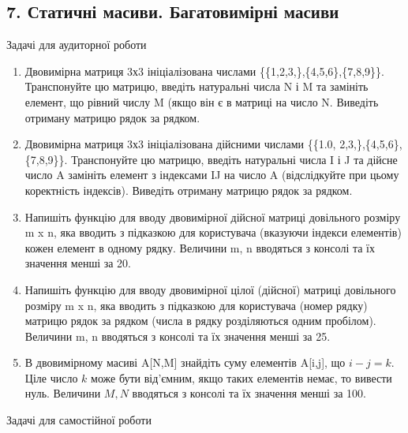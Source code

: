 \documentclass[]{article}
\makeatletter
\newcommand{\xslalph}[1]{\expandafter\@xslalph\csname c@#1\endcsname}
\newcommand{\@xslalph}[1]{%
    \ifcase#1\or а\or б\or в\or г\or д\or e\or є\or ж\or з\or i%
    \or й\or к\or л\or м\or н\or о\or п\or р\or с\or т%
    \or у\or ф\or х\or ц\or ч\or ш\or ю\or я\or аа\or бб\or вв%
    \else\@ctrerr\fi%
}
\makeatother
\begin{document}
\begin{enumerate}
\begin{enumerate}[label=\xslalph*)]
\begin{enumerate}
\begin{enumerate}[label=\xslalph*)]
\newpage
\subsection{ 7. Статичні масиви. Багатовимірні масиви }
\setcounter{subsection}{1}

Задачі для аудиторної роботи

\begin{enumerate}
\def\labelenumi{\arabic{enumi})}
\item
  Двовимірна матриця 3х3 ініціалізована числами
  \{\{1,2,3,\},\{4,5,6\},\{7,8,9\}\}. Транспонуйте цю матрицю, введіть
  натуральні числа N і M та замініть елемент, що рівний числу M (якщо
  він є в матриці на число N. Виведіть отриману матрицю рядок за
  рядком.
\item
  Двовимірна матриця 3х3 ініціалізована дійсними числами \{\{1.0,
  2,3,\},\{4,5,6\},\{7,8,9\}\}. Транспонуйте цю матрицю, введіть
  натуральні числа I і J та дійсне число A замініть елемент з індексами
  IJ на число A (відслідкуйте при цьому коректність індексів). Виведіть
  отриману матрицю рядок за рядком.
\item
  Напишіть функцію для вводу двовимірної дійсної матриці довільного
  розміру m x n, яка вводить з підказкою для користувача (вказуючи
  індекси елементів) кожен елемент в одному рядку. Величини m, n
  вводяться з консолі та їх значення менші за 20.
\item
  Напишіть функцію для вводу двовимірної цілої (дійсної) матриці
  довільного розміру m x n, яка вводить з підказкою для користувача
  (номер рядку) матрицю рядок за рядком (числа в рядку розділяються
  одним пробілом). Величини m, n вводяться з консолі та їх значення
  менші за 25.
\item
  В двовимірному масиві A{[}N,M{]} знайдіть суму елементів A{[}i,j{]},
  що $i-j=k$. Ціле число $k$ може бути від'ємним, якщо таких елементів
  немає, то вивести нуль. Величини $M, N$ вводяться з консолі та їх
  значення менші за 100.
\end{enumerate}

Задачі для самостійної роботи


\end{enumerate}
\end{enumerate}
\end{enumerate}
\end{enumerate}
\end{document}
